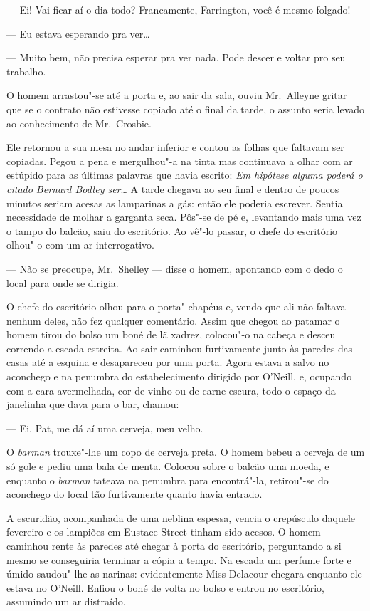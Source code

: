 --- Ei!  Vai ficar aí o dia todo?  Francamente, Farrington, você é mesmo
folgado!

--- Eu estava esperando pra ver\ldots{}

--- Muito bem, não precisa esperar pra ver nada.  Pode descer e voltar pro seu
trabalho.

O homem arrastou"-se até a porta e, ao sair da sala, ouviu Mr.~Alleyne gritar
que se o contrato não estivesse copiado até o final da tarde, o assunto seria
levado ao conhecimento de Mr.~Crosbie.

Ele retornou a sua mesa no andar inferior e contou as folhas que faltavam ser
copiadas.  Pegou a pena e mergulhou"-a na tinta mas continuava a olhar com ar
estúpido para as últimas palavras que havia escrito: \textit{Em hipótese
alguma poderá o citado Bernard Bodley ser}\ldots{}  A tarde chegava ao
seu final e dentro de poucos minutos seriam acesas as lamparinas a gás: então
ele poderia escrever.  Sentia necessidade de molhar a garganta seca.  Pôs"-se de
pé e, levantando mais uma vez o tampo do balcão, saiu do escritório.  Ao vê"-lo
passar, o chefe do escritório olhou"-o com um ar interrogativo.

--- Não se preocupe, Mr.~Shelley --- disse o homem, apontando com o dedo o
local para onde se dirigia.

O chefe do escritório olhou para o porta"-chapéus e, vendo que ali não faltava
nenhum deles, não fez qualquer comentário.  Assim que chegou ao patamar o homem
tirou do bolso um boné de lã xadrez, colocou"-o na cabeça e desceu correndo a
escada estreita.  Ao sair caminhou furtivamente junto às paredes das casas até
a esquina e desapareceu por uma porta.  Agora estava a salvo no aconchego e na
penumbra do estabelecimento dirigido por O’Neill, e, ocupando com a cara
avermelhada, cor de vinho ou de carne escura, todo o espaço da janelinha que
dava para o bar, chamou:

--- Ei, Pat, me dá aí uma cerveja, meu velho.

O \textit{barman} trouxe"-lhe um copo de cerveja preta.  O homem bebeu a cerveja
de um só gole e pediu uma bala de menta.  Colocou sobre o balcão uma moeda, e
enquanto o \textit{barman} tateava na penumbra para encontrá"-la, retirou"-se do
aconchego do local tão furtivamente quanto havia entrado.

A escuridão, acompanhada de uma neblina espessa, vencia o crepúsculo daquele
fevereiro e os lampiões em Eustace Street tinham sido acesos.  O homem caminhou
rente às paredes até chegar à porta do escritório, perguntando a si mesmo se
conseguiria terminar a cópia a tempo.  Na escada um perfume forte e úmido
saudou"-lhe as narinas: evidentemente Miss Delacour chegara enquanto ele estava
no O’Neill.  Enfiou o boné de volta no bolso e entrou no escritório, assumindo
um ar distraído.

